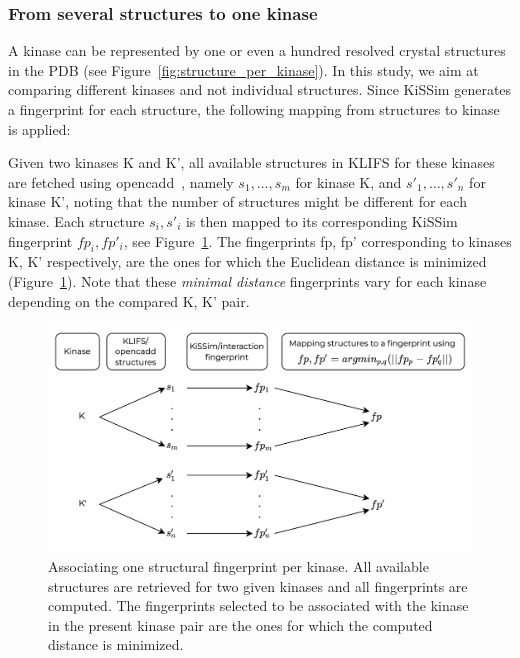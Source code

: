 \documentclass[9pt,training,ASAPversion]{livecoms}
\newcommand{\kinA}{K}
\newcommand{\kinB}{K'}
\begin{document}
\subsubsection{From several structures to one kinase}

A kinase can be represented by one or even a hundred resolved crystal structures in the PDB (see Figure~\ref{fig:structure_per_kinase}). In this study, we aim at comparing different kinases and not individual structures. Since KiSSim generates a fingerprint for each structure, the following mapping from structures to kinase is applied:

Given two kinases \kinA{} and \kinB{}, all available structures in KLIFS for these kinases are fetched using opencadd~\cite{Sydow_2022_JOSS}, namely $s_1, \dots, s_m$ for kinase \kinA, and $s'_1, \dots, s'_n$ for kinase \kinB, noting that the number of structures might be different for each kinase. Each structure $s_i, s'_i$ is then mapped to its corresponding KiSSim fingerprint $fp_i, fp'_i$, see Figure~\ref{fig:structure_to_kinase}. The fingerprints fp, fp' corresponding to kinases \kinA{}, \kinB{} respectively, are the ones for which the Euclidean distance is minimized (Figure~\ref{fig:structure_to_kinase}). Note that these \textit{minimal distance} fingerprints vary for each kinase depending on the compared \kinA{}, \kinB{} pair.

\begin{figure}[ht]
    \centering
    \includegraphics[width=\columnwidth]{structure_to_kinase.png}
    \caption{Associating one structural fingerprint per kinase. All available structures are retrieved for two given kinases and all fingerprints are computed. The fingerprints selected to be associated with the kinase in the present kinase pair are the ones for which the computed distance is minimized.}
    \label{fig:structure_to_kinase}
\end{figure}
\end{document}

